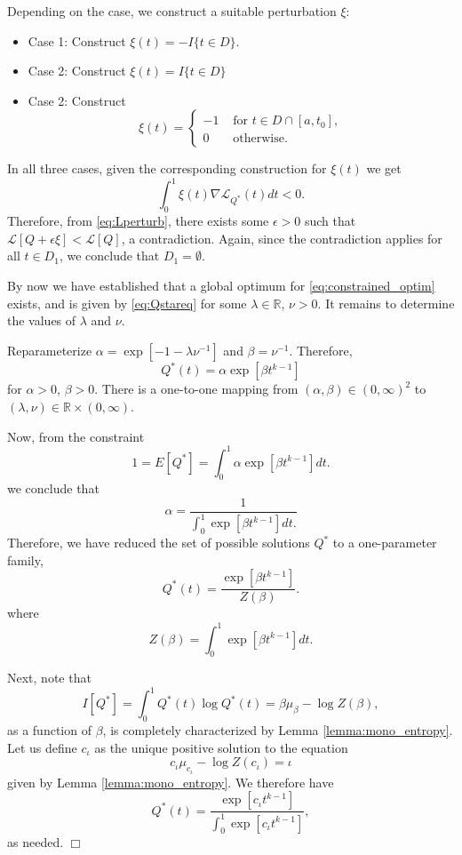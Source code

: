 \documentclass[12pt]{article}
\begin{document}
Depending on the case, we construct a suitable perturbation $\xi$:
\begin{itemize}
\item Case 1: Construct $\xi(t) = -I\{t \in D\}$.
\item Case 2: Construct $\xi(t) = I\{t \in D\}$
\item Case 2: Construct
\[
\xi(t) = \begin{cases}
-1 & \text{ for }t \in D \cap [a, t_0],\\
0 & \text{ otherwise. }
\end{cases}
\]
\end{itemize}
In all three cases, given the corresponding construction for $\xi(t)$ we get
\[
\int_0^1 \xi(t) \nabla \mathcal{L}_{Q^*}(t) dt < 0.
\]
Therefore, from \eqref{eq:Lperturb}, there exists some $\epsilon > 0$
such that $\mathcal{L}[Q + \epsilon \xi] < \mathcal{L}[Q]$, a
contradiction.  Again, since the contradiction applies for all $t \in
D_1$, we conclude that $D_1 = \emptyset$.

By now we have established that a global optimum
for \eqref{eq:constrained_optim} exists, and is given
by \eqref{eq:Qstareq} for some $\lambda \in \mathbb{R}$, $\nu > 0$.  It remains
to determine the values of $\lambda$ and $\nu$.

Reparameterize $\alpha = \exp[-1-\lambda\nu^{-1}]$ and $\beta = \nu^{-1}$.
Therefore,
\[
Q^*(t) = \alpha \exp[\beta t^{k-1}]
\]
for $\alpha > 0$, $\beta > 0$.  There is a one-to-one mapping from
$(\alpha, \beta) \in (0, \infty)^2$ to $(\lambda, \nu) \in
\mathbb{R} \times (0,\infty)$.

Now, from the constraint
\[
1 = E[Q^*] = \int_0^1 \alpha \exp[\beta t^{k-1}] dt.
\]
we conclude that
\[
\alpha = \frac{1}{\int_0^1 \exp[\beta t^{k-1}] dt.}
\]
Therefore, we have reduced the set of possible solutions $Q^*$ to a one-parameter family,
\[
Q^*(t) = \frac{\exp[\beta t^{k-1}]}{Z(\beta)}.
\]
where
\[
Z(\beta) = \int_0^1 \exp[\beta t^{k-1}] dt.
\]

Next, note that
\[
I[Q^*] = \int_0^1 Q^*(t) \log Q^*(t) = \beta \mu_\beta - \log Z(\beta),
\]
as a function of $\beta$, is completely characterized by Lemma \ref{lemma:mono_entropy}.
Let us define $c_\iota$ as the unique positive solution to the equation
\[
c_\iota \mu_{c_\iota} - \log Z(c_\iota) = \iota
\]
given by Lemma \ref{lemma:mono_entropy}.
We therefore have
\[
Q^*(t) = \frac{\exp[c_\iota t^{k-1}]}{\int_0^1 \exp[c_\iota t^{k-1}]},
\]
as needed. $\Box$
\end{document}
